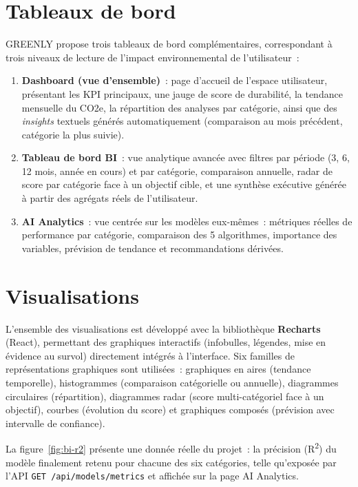 \section{Tableaux de bord}

GREENLY propose trois tableaux de bord complémentaires, correspondant à trois niveaux de lecture de l'impact environnemental de l'utilisateur~:

\begin{enumerate}
    \item \textbf{Dashboard (vue d'ensemble)}~: page d'accueil de l'espace utilisateur, présentant les KPI principaux, une jauge de score de durabilité, la tendance mensuelle du CO2e, la répartition des analyses par catégorie, ainsi que des \textit{insights} textuels générés automatiquement (comparaison au mois précédent, catégorie la plus suivie).
    \item \textbf{Tableau de bord BI}~: vue analytique avancée avec filtres par période (3, 6, 12 mois, année en cours) et par catégorie, comparaison annuelle, radar de score par catégorie face à un objectif cible, et une synthèse exécutive générée à partir des agrégats réels de l'utilisateur.
    \item \textbf{AI Analytics}~: vue centrée sur les modèles eux-mêmes~: métriques réelles de performance par catégorie, comparaison des 5 algorithmes, importance des variables, prévision de tendance et recommandations dérivées.
\end{enumerate}

\section{Visualisations}

L'ensemble des visualisations est développé avec la bibliothèque \textbf{Recharts} (React), permettant des graphiques interactifs (infobulles, légendes, mise en évidence au survol) directement intégrés à l'interface. Six familles de représentations graphiques sont utilisées~: graphiques en aires (tendance temporelle), histogrammes (comparaison catégorielle ou annuelle), diagrammes circulaires (répartition), diagrammes radar (score multi-catégoriel face à un objectif), courbes (évolution du score) et graphiques composés (prévision avec intervalle de confiance).

La figure~\ref{fig:bi-r2} présente une donnée réelle du projet~: la précision (R\textsuperscript{2}) du modèle finalement retenu pour chacune des six catégories, telle qu'exposée par l'API \texttt{GET~/api/models/metrics} et affichée sur la page AI Analytics.

